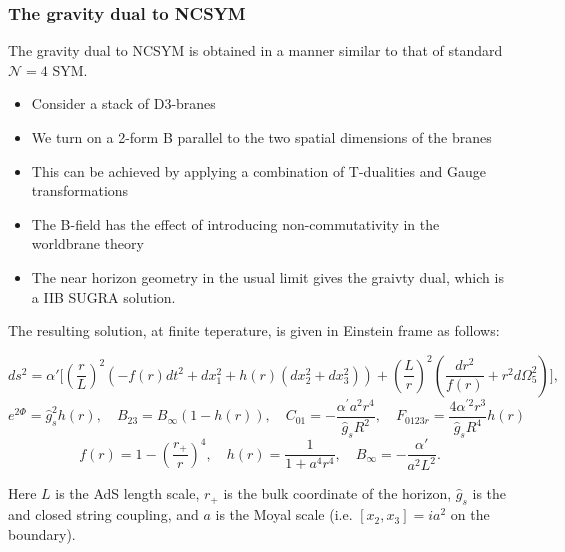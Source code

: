\documentclass[8pt,aspectratio=169]{beamer}
\begin{document}
\begin{frame}
\frametitle{The gravity dual to NCSYM}

The gravity dual to NCSYM is obtained in a manner similar to that of standard $\mathcal{N} = 4$ SYM.

\begin{itemize}

\item Consider a stack of D3-branes

\item We turn on a 2-form B parallel to the two spatial dimensions of the branes

\item This can be achieved by applying a combination of T-dualities and Gauge transformations

\item The B-field has the effect of introducing non-commutativity in the worldbrane theory

\item The near horizon geometry in the usual limit gives the graivty dual, which is a IIB SUGRA solution.

\end{itemize}

The resulting solution, at finite teperature, is given in Einstein frame as follows:

\begin{equation}
ds^2 = \alpha' \bigg[ \left(\frac{r}{L}\right)^2
\left(- f(r) dt^2 + dx_1^2  + h(r) (dx_2^2 + dx_3^2)\right)
+\left(\frac{L}{r}\right)^2 \left(
\frac{dr^2}{f(r)} + r^2 d\Omega_5^2\right)\bigg],
\end{equation}
%
\begin{equation}
e^{2\Phi} = \hat{g}_s^2 h(r) ,\quad B_{23} = B_{\infty}(1-h(r)) ,\quad C_{01} = -\frac{\alpha^{\prime} a^2 r^4}{\hat{g}_s R^2} ,\quad F_{0123r} = \frac{4\alpha^{\prime 2} r^3}{\hat{g}_s R^4} h(r)
\end{equation}
%
\begin{equation}
f(r) = 1 - \left(\frac{r_+}{r}\right)^4 ,\quad h(r) = \frac{1}{1 + a^4 r^4} ,\quad B_{\infty} = -\frac{\alpha'}{a^2 L^2}. 
\end{equation}

Here $L$ is the AdS length scale, $r_+$ is the bulk coordinate of the horizon, $\hat{g}_s$ is the  and closed string coupling, and $a$ is the Moyal scale (i.e. $[x_2,x_3]= i a^2$ on the boundary).

\end{frame}
\end{document}
